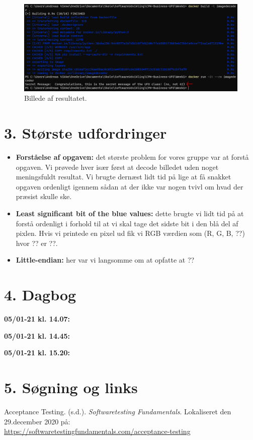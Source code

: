 \documentclass[10pt]{report}
\begin{document}
\begin{figure}[H]
  \centering
  \includegraphics[width=\textwidth]{Result.png}
  \caption{Billede af resultatet.}
\end{figure}

\chapter*{3. Største udfordringer}
\pagestyle{fancy}
\begin{itemize}
  \item \textbf{Forståelse af opgaven:} det største problem for vores gruppe var at forstå opgaven. Vi prøvede hver især først at decode billedet uden noget meningsfuldt resultat. Vi brugte dernæst lidt tid på lige at få snakket opgaven ordenligt igennem sådan at der ikke var nogen tvivl om hvad der præsist skulle ske.
  \item \textbf{Least significant bit of the blue values:} dette brugte vi lidt tid på at forstå ordenligt i forhold til at vi skal tage det sidste bit i den blå del af pixlen. Hvis vi printede en pixel ud fik vi RGB værdien som (R, G, B, ??) hvor ?? er ??.
  \item \textbf{Little-endian:} her var vi langsomme om at opfatte at ??
\end{itemize}

\chapter*{4. Dagbog}
\pagestyle{fancy}

\noindent\textbf{05/01-21 kl. 14.07:}

\noindent\textbf{05/01-21 kl. 14.45:}

\noindent\textbf{05/01-21 kl. 15.20:}


\chapter*{5. Søgning og links}
\pagestyle{fancy}
\noindent Acceptance Testing. (s.d.). \textit{Softwaretesting Fundamentals}. Lokaliseret den 29.december 2020 på:\\
\href{https://softwaretestingfundamentals.com/acceptance-testing}{https://softwaretestingfundamentals.com/acceptance-testing}
\end{document}
